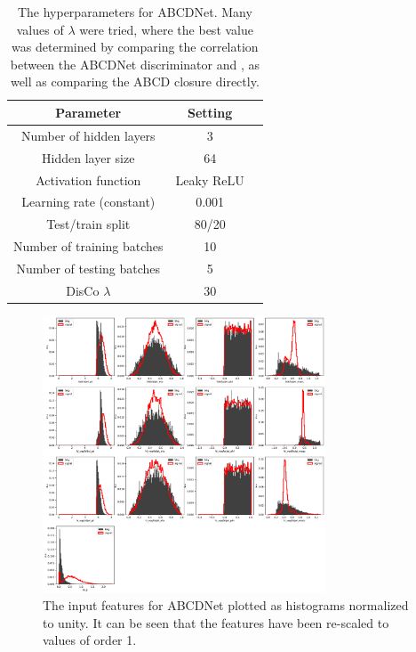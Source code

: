 \begin{table}[htbp]
    \centering
    \caption[ABCDNet hyperparameters]{
        The hyperparameters for ABCDNet. 
        Many values of $\lambda$ were tried, where the best value was determined by comparing the correlation between the ABCDNet discriminator and \detajj, as well as comparing the ABCD closure directly. 
    }
    \begin{tabular}{ccc}
    \toprule
    Parameter & Setting \\
    \midrule
    Number of hidden layers    & 3          \\
    Hidden layer size          & 64         \\
    Activation function        & Leaky ReLU \\
    Learning rate (constant)   & 0.001      \\
    Test/train split           & 80/20      \\
    Number of training batches & 10         \\
    Number of testing batches  & 5          \\
    DisCo $\lambda$            & 30         \\
    \bottomrule
    \end{tabular}
    \label{tab:vbsvvh_abcdnet_params}
\end{table}

\begin{figure}[htb]
    \centering
    \includegraphics[width=0.75\textwidth]{fig/vbsvvh/all_features.pdf}
    \caption[The input features for ABCDNet plotted as histograms normalized to unity]{
        The input features for ABCDNet plotted as histograms normalized to unity. 
        It can be seen that the features have been re-scaled to values of order 1.
    }
    \label{fig:vbsvvh_abcdnet_inputs}
\end{figure}

